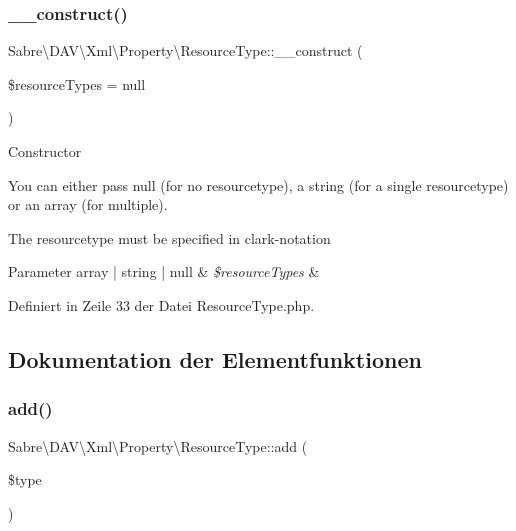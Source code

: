 \subsubsection{\texorpdfstring{\+\_\+\+\_\+construct()}{\_\_construct()}}
{\footnotesize\ttfamily Sabre\textbackslash{}\+D\+A\+V\textbackslash{}\+Xml\textbackslash{}\+Property\textbackslash{}\+Resource\+Type\+::\+\_\+\+\_\+construct (\begin{DoxyParamCaption}\item[{}]{\$resource\+Types = {\ttfamily null} }\end{DoxyParamCaption})}

Constructor

You can either pass null (for no resourcetype), a string (for a single resourcetype) or an array (for multiple).

The resourcetype must be specified in clark-\/notation


\begin{DoxyParams}[1]{Parameter}
array | string | null & {\em \$resource\+Types} & \\
\hline
\end{DoxyParams}


Definiert in Zeile 33 der Datei Resource\+Type.\+php.



\subsection{Dokumentation der Elementfunktionen}
\mbox{\label{class_sabre_1_1_d_a_v_1_1_xml_1_1_property_1_1_resource_type_a999ff65c2b8075252dd1dd6629fefc6d}} 
\subsubsection{\texorpdfstring{add()}{add()}}
{\footnotesize\ttfamily Sabre\textbackslash{}\+D\+A\+V\textbackslash{}\+Xml\textbackslash{}\+Property\textbackslash{}\+Resource\+Type\+::add (\begin{DoxyParamCaption}\item[{}]{\$type }\end{DoxyParamCaption})}


